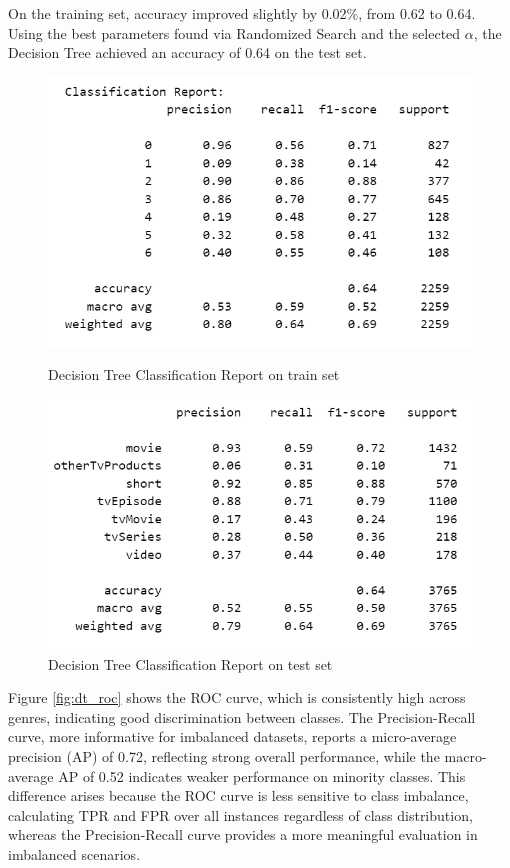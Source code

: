 \documentclass[10pt]{article}
\begin{document}
On the training set, accuracy improved slightly by 0.02\%, from 0.62 to 0.64. Using the best parameters found via Randomized Search and the selected $\alpha$, the Decision Tree achieved an accuracy of 0.64 on the test set. 
\begin{figure}[ht]
    \centering
    \begin{minipage}{0.48\textwidth}
        \centering
        \includegraphics[width=\linewidth]{Dt_reportval.png}
        \caption{Decision Tree Classification Report on train set}
        \label{fig:dt_report}
    \end{minipage}
    \hfill
    \begin{minipage}{0.48\textwidth}
        \centering
        \includegraphics[width=\linewidth]{ReportDT.png}
        \caption{Decision Tree Classification Report on test set}
        \label{fig:dt_report}
    \end{minipage}
\end{figure}
Figure \ref{fig:dt_roc} shows the ROC curve, which is consistently high across genres, indicating good discrimination between classes. The Precision-Recall curve, more informative for imbalanced datasets, reports a micro-average precision (AP) of 0.72, reflecting strong overall performance, while the macro-average AP of 0.52 indicates weaker performance on minority classes. This difference arises because the ROC curve is less sensitive to class imbalance, calculating TPR and FPR over all instances regardless of class distribution, whereas the Precision-Recall curve provides a more meaningful evaluation in imbalanced scenarios.
\end{document}
